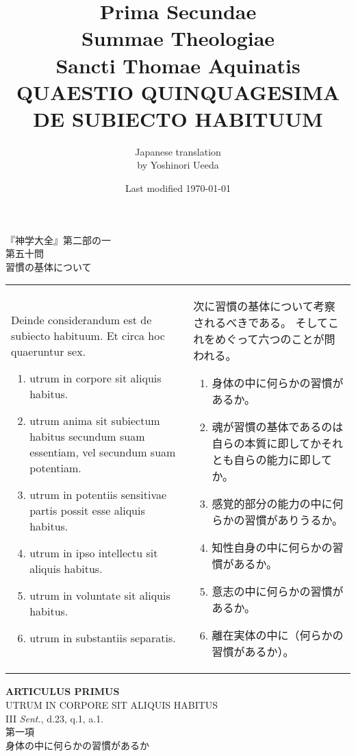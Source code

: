 \documentclass[10pt]{jsarticle} %
\title{{\bf Prima Secundae}\\{\HUGE Summae Theologiae}\\Sancti Thomae
Aquinatis\\{\sffamily QUAESTIO QUINQUAGESIMA}\\{\bf DE SUBIECTO HABITUUM}}
\author{Japanese translation\\by Yoshinori {\sc Ueeda}}
\date{Last modified \today}
\begin{document}
\maketitle
\thispagestyle{empty}
\begin{center}
{\Large 『神学大全』第二部の一\\第五十問\\習慣の基体について}
\end{center}


\begin{longtable}{p{21em}p{21em}}

Deinde considerandum est de subiecto habituum. Et circa hoc quaeruntur
sex. 

\begin{enumerate}
 \item utrum in corpore sit aliquis habitus.
 \item utrum anima sit subiectum habitus secundum suam essentiam, vel secundum suam potentiam.
 \item utrum in potentiis sensitivae partis possit esse aliquis habitus.
 \item utrum in ipso intellectu sit aliquis habitus.
 \item utrum in voluntate sit aliquis habitus.
 \item utrum in substantiis separatis.
\end{enumerate}

&

次に習慣の基体について考察されるべきである。
そしてこれをめぐって六つのことが問われる。
\begin{enumerate}
 \item 身体の中に何らかの習慣があるか。
 \item 魂が習慣の基体であるのは自らの本質に即してかそれとも自らの能力に即してか。
 \item 感覚的部分の能力の中に何らかの習慣がありうるか。
 \item 知性自身の中に何らかの習慣があるか。
 \item 意志の中に何らかの習慣があるか。
 \item 離在実体の中に（何らかの習慣があるか）。
\end{enumerate}

\end{longtable}
\newpage
{}
\begin{center}
{\Large {\bf ARTICULUS PRIMUS}}\\
{\large UTRUM IN CORPORE SIT ALIQUIS HABITUS}\\
{\footnotesize III {\itshape Sent.}, d.23, q.1, a.1.}\\
{\Large 第一項\\身体の中に何らかの習慣があるか}
\end{center}
\end{document}

